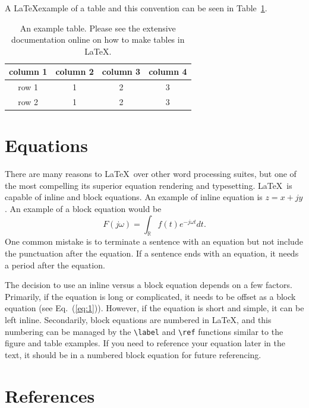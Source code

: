 A \LaTeX example of a table and this convention can be seen in Table~\ref{tab:exampleTable}.
\begin{table}[h!]
  \centering
  \begin{tabular}[h!]{| c | c | c | c |}
    \hline
    column 1 & column 2 & column 3 & column 4 \\
    \hline\hline
    row 1 & 1 & 2 & 3 \\
    \hline
    row 2 & 1 & 2 & 3 \\
    \hline
  \end{tabular}
  \caption[Short table caption.]{An example table.  Please see the extensive documentation online on how to make tables in \LaTeX.}
  \label{tab:exampleTable}
\end{table}

\section{Equations}
\label{sec:equations}

There are many reasons to \LaTeX\ over other word processing suites, but one of the most compelling its superior equation rendering and typesetting.  \LaTeX\ is capable of inline and block equations.  An example of inline equation is $z=x+jy$.  An example of a block equation would be
\begin{equation}
  \label{eq:1}
  F(j\omega) = \int_\mathbb{R} f(t)e^{-j\omega t}dt.
\end{equation}
One common mistake is to terminate a sentence with an equation but not include the punctuation after the equation.  If a sentence ends with an equation, it needs a period after the equation.

The decision to use an inline versus a block equation depends on a few factors.  Primarily, if the equation is long or complicated, it needs to be offset as a block equation (see Eq.~(\ref{eq:1})).  However, if the equation is short and simple, it can be left inline.  Secondarily, block equations are numbered in \LaTeX, and this numbering can be managed by the \verb+\label+ and \verb+\ref+ functions similar to the figure and table examples.  If you need to reference your equation later in the text, it should be in a numbered block equation for future referencing.

\section{References}
\label{sec:references}

